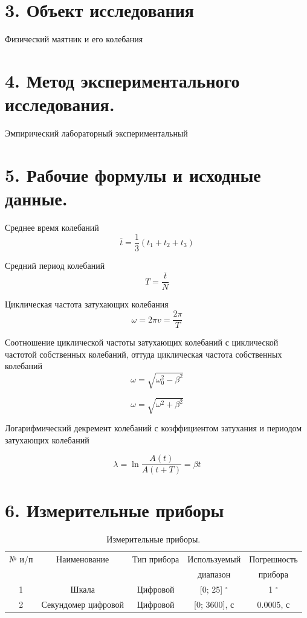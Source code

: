 \documentclass[14pt]{extreport}
\begin{document}
\section*{3. Объект исследования}
Физический маятник и его колебания

\section*{4. Метод экспериментального исследования.}
Эмпирический лабораторный экспериментальный

\section*{5. Рабочие формулы и исходные данные.}
Среднее время колебаний 
\begin{equation}\label{f1}
   \overline{t} = \frac{1}{3} (t_1 + t_2 + t_3)
\end{equation}

Средний период колебаний
\begin{equation}\label{f1}
   T = \frac{\overline{t}}{N}
\end{equation}

Циклическая частота затухающих колебания
\begin{equation}\label{f1}
   \omega = 2\pi v = \frac{2\pi}{T}
\end{equation}

Соотношение циклической частоты затухающих колебаний с циклической частотой собственных колебаний, оттуда циклическая частота собственных колебаний
\begin{equation}\label{f1}
   \omega = \sqrt{\omega_{0}^2 - \beta^2}
\end{equation}

\begin{equation}\label{f1}
   \omega = \sqrt{\omega^2 + \beta^2}
\end{equation}

Логарифмический декремент колебаний с коэффициентом затухания и периодом затухающих колебаний

\begin{equation}\label{f1}
   \lambda = \ln{\frac{A(t)}{A(t + T)}} = \beta t
\end{equation}

\section*{6. Измерительные приборы}
\begin{table}[H]\label{t1}
\caption{Измерительные приборы.}
\centering
\begin{tabular}{|c|c|c|c|c|}
\hline
 № и/п & Наименование & Тип прибора & Используемый & Погрешность \\ 
 & & & диапазон & прибора \\ \hline
 1 & Шкала & Цифровой & [0; 25] $^\circ$ & 1 $^\circ$ \\ \hline
 2 & Секундомер цифровой & Цифровой & [0; 3600], с & 0.0005, с \\ \hline
 
\end{tabular}
\end{table}
\end{document}
